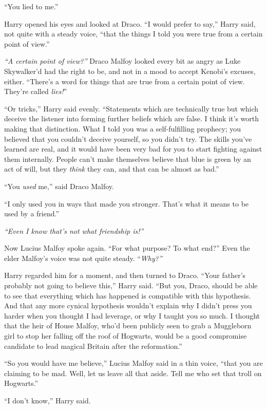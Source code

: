 ``You lied to me.''

Harry opened his eyes and looked at Draco. ``I would prefer to say,'' Harry said, not quite with a steady voice, ``that the things I told you were true from a certain point of view.''

\emph{``A certain point of view?''} Draco Malfoy looked every bit as angry as Luke Skywalker'd had the right to be, and not in a mood to accept Kenobi's excuses, either. ``There's a word for things that are true from a certain point of view. They're called \emph{lies!}''

``Or tricks,'' Harry said evenly. ``Statements which are technically true but which deceive the listener into forming further beliefs which are false. I think it's worth making that distinction. What I told you was a self-fulfilling prophecy; you believed that you couldn't deceive yourself, so you didn't try. The skills you've learned are real, and it would have been very bad for you to start fighting against them internally. People can't make themselves believe that blue is green by an act of will, but they \emph{think} they can, and that can be almost as bad.''

``You \emph{used} me,'' said Draco Malfoy.

``I only used you in ways that made you stronger. That's what it means to be used by a friend.''

\emph{``Even I know that's not what friendship is!''}

Now Lucius Malfoy spoke again. ``For what purpose? To what end?'' Even the elder Malfoy's voice was not quite steady. ``\emph{Why?''}

Harry regarded him for a moment, and then turned to Draco. ``Your father's probably not going to believe this,'' Harry said. ``But you, Draco, should be able to see that everything which has happened is compatible with this hypothesis. And that any more cynical hypothesis wouldn't explain why I didn't press you harder when you thought I had leverage, or why I taught you so much. I thought that the heir of House Malfoy, who'd been publicly seen to grab a Muggleborn girl to stop her falling off the roof of Hogwarts, would be a good compromise candidate to lead magical Britain after the reformation.''

``So you would have me believe,'' Lucius Malfoy said in a thin voice, ``that you are claiming to be mad. Well, let us leave all that aside. Tell me who set that troll on Hogwarts.''

``I don't know,'' Harry said.

